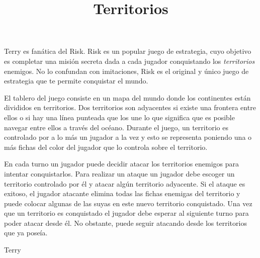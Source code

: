 \documentclass{oci}
\title{Territorios}
\begin{document}
\begin{problemDescription}
  Terry es fanática del Risk.
  Risk es un popular juego de estrategia, cuyo objetivo es completar una misión
  secreta dada a cada jugador conquistando los \emph{territorios} enemigos.
  No lo confundan con imitaciones, Risk es el original y único juego de
  estrategia que te permite conquistar el mundo.

  El tablero del juego consiste en un mapa del mundo donde los continentes están
  divididos en territorios.
  Dos territorios son adyacentes si existe una frontera entre ellos o si hay una
  línea punteada que los une lo que significa que es posible navegar entre ellos
  a través del océano.
  Durante el juego, un territorio es controlado por a lo más un jugador a la vez
  y esto se representa poniendo una o más fichas del color del jugador que lo
  controla sobre el territorio. 

  En cada turno un jugador puede decidir atacar los territorios enemigos
  para intentar conquistarlos.
  Para realizar un ataque un jugador debe escoger un territorio controlado por
  él y atacar algún territorio adyacente.
  Si el ataque es exitoso, el jugador atacante elimina todas las fichas enemigas
  del territorio y puede colocar algunas de las suyas en este nuevo territorio
  conquistado.
  Una vez que un territorio es conquistado el jugador debe esperar al siguiente
  turno para poder atacar desde él.
  No obstante, puede seguir atacando desde los territorios que ya poseía.

  Terry 

\end{problemDescription}
\end{document}
